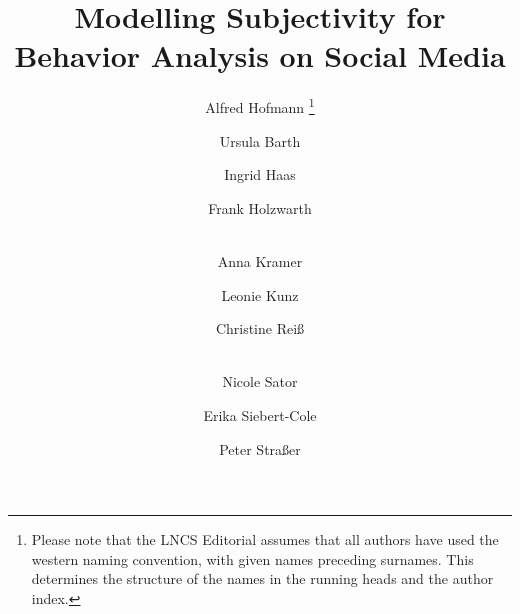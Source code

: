 \documentclass[runningheads,a4paper]{llncs}
\begin{document}
\mainmatter  %

\title{Modelling Subjectivity for Behavior Analysis on Social Media}


%
%
\author{Alfred Hofmann%
\thanks{Please note that the LNCS Editorial assumes that all authors have used
the western naming convention, with given names preceding surnames. This determines
the structure of the names in the running heads and the author index.}%
\and Ursula Barth\and Ingrid Haas\and Frank Holzwarth\and\\
Anna Kramer\and Leonie Kunz\and Christine Rei\ss\and\\
Nicole Sator\and Erika Siebert-Cole\and Peter Stra\ss er}
%


%
%

\maketitle
\end{document}
